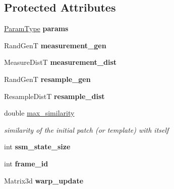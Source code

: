 \subsection*{Protected Attributes}
\begin{DoxyCompactItemize}
\item 
\hypertarget{classPF_a049c5944c927b0c8f1b483ddda14fbc7}{\hyperlink{structPFParams}{Param\-Type} {\bfseries params}}\label{classPF_a049c5944c927b0c8f1b483ddda14fbc7}

\item 
\hypertarget{classPF_a4dd71d8e8bb6d2581b6fafce7e2942a3}{Rand\-Gen\-T {\bfseries measurement\-\_\-gen}}\label{classPF_a4dd71d8e8bb6d2581b6fafce7e2942a3}

\item 
\hypertarget{classPF_a7a980ba486569d8c350b5c6b897c7b29}{Measure\-Dist\-T {\bfseries measurement\-\_\-dist}}\label{classPF_a7a980ba486569d8c350b5c6b897c7b29}

\item 
\hypertarget{classPF_a548420fcf91b6f6a0f1465e2a3f036c1}{Rand\-Gen\-T {\bfseries resample\-\_\-gen}}\label{classPF_a548420fcf91b6f6a0f1465e2a3f036c1}

\item 
\hypertarget{classPF_a101bb60c1fcc129c1b2a7e3ce5c5ed94}{Resample\-Dist\-T {\bfseries resample\-\_\-dist}}\label{classPF_a101bb60c1fcc129c1b2a7e3ce5c5ed94}

\item 
\hypertarget{classPF_a8d03c6cfb90bf9f711d5a80aac777835}{double \hyperlink{classPF_a8d03c6cfb90bf9f711d5a80aac777835}{max\-\_\-similarity}}\label{classPF_a8d03c6cfb90bf9f711d5a80aac777835}

\begin{DoxyCompactList}\small\item\em similarity of the initial patch (or template) with itself \end{DoxyCompactList}\item 
\hypertarget{classPF_ada7f8262c7aeb1a92db4e786e84c58bc}{int {\bfseries ssm\-\_\-state\-\_\-size}}\label{classPF_ada7f8262c7aeb1a92db4e786e84c58bc}

\item 
\hypertarget{classPF_a9cddd0ae9d1009d55777ef1847c0317d}{int {\bfseries frame\-\_\-id}}\label{classPF_a9cddd0ae9d1009d55777ef1847c0317d}

\item 
\hypertarget{classPF_a6464ac12a0744e5daab5deee52a762de}{Matrix3d {\bfseries warp\-\_\-update}}\label{classPF_a6464ac12a0744e5daab5deee52a762de}


\end{DoxyCompactItemize}
